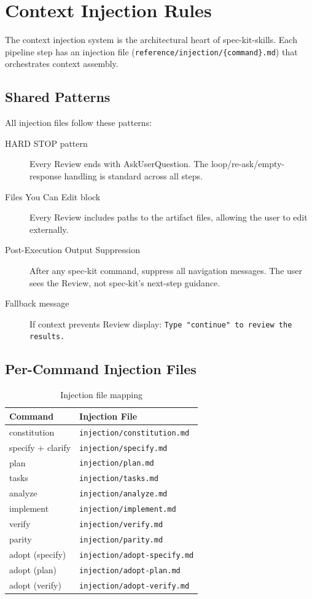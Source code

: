 \documentclass[11pt,a4paper,openright,twoside]{report}
\newcommand{\file}[1]{\texttt{#1}}
\begin{document}
\section{Context Injection Rules}

The context injection system is the architectural heart of spec-kit-skills. Each pipeline step has an injection file (\file{reference/injection/\{command\}.md}) that orchestrates context assembly.

\subsection{Shared Patterns}

All injection files follow these patterns:

\begin{description}
  \item[HARD STOP pattern] Every Review ends with AskUserQuestion. The loop/re-ask/empty-response handling is standard across all steps.
  \item[Files You Can Edit block] Every Review includes paths to the artifact files, allowing the user to edit externally.
  \item[Post-Execution Output Suppression] After any spec-kit command, suppress all navigation messages. The user sees the Review, not spec-kit's next-step guidance.
  \item[Fallback message] If context prevents Review display: \texttt{Type "continue" to review the results.}
\end{description}

\subsection{Per-Command Injection Files}

\begin{table}[H]
\centering
\caption{Injection file mapping}
\label{tab:injection-files}
\begin{tabularx}{\textwidth}{lX}
\toprule
\textbf{Command} & \textbf{Injection File} \\
\midrule
constitution & \file{injection/constitution.md} \\
specify + clarify & \file{injection/specify.md} \\
plan & \file{injection/plan.md} \\
tasks & \file{injection/tasks.md} \\
analyze & \file{injection/analyze.md} \\
implement & \file{injection/implement.md} \\
verify & \file{injection/verify.md} \\
parity & \file{injection/parity.md} \\
adopt (specify) & \file{injection/adopt-specify.md} \\
adopt (plan) & \file{injection/adopt-plan.md} \\
adopt (verify) & \file{injection/adopt-verify.md} \\
\bottomrule
\end{tabularx}
\end{table}
\end{document}
